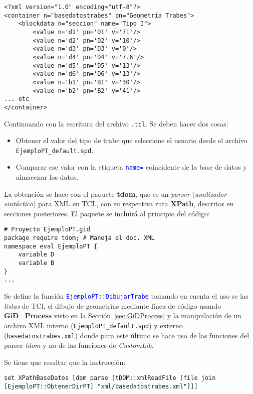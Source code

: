 \documentclass[10pt, a4paper, twocolumn]{article} %
\begin{document}
\lstset{language=XML} 
\begin{lstlisting}[caption={Extracto de la base de datos de la geometría.}]
<?xml version="1.0" encoding="utf-8"?>
<container n="basedatostrabes" pn="Geometria Trabes">
	<blockdata n="seccion" name="Tipo I">
		<value n='d1' pn='D1' v='71'/>
		<value n='d2' pn='D2' v='10'/>
		<value n='d3' pn='D3' v='0'/>
		<value n='d4' pn='D4' v='7.6'/>
		<value n='d5' pn='D5' v='13'/>
		<value n='d6' pn='D6' v='13'/>
		<value n='b1' pn='B1' v='30'/>
		<value n='b2' pn='B2' v='41'/>
... etc
</container>
\end{lstlisting}

Continuando con la escritura del archivo \texttt{.tcl}. Se deben hacer dos cosas:

\begin{itemize}
	\item Obtener el valor del tipo de trabe que seleccione el usuario desde el archivo \texttt{EjemploPT\_default.spd}.
	\item Comparar ese valor con la etiqueta \textcolor{blue}{\texttt{name=}} coincidente de la base de datos y almacenar los datos.
\end{itemize}

La obtención se hace con el paquete \textbf{tdom}, que es un \textit{parser} (\textit{analizador sintáctico}) para XML en TCL, con su respectiva ruta \textbf{XPath}, descritos en secciones posteriores. El paquete se incluirá al principio del código:

\lstset{language=tcl} 
\begin{lstlisting}[caption={Código para inicializar el proyecto y crear el menú.}]
# Proyecto EjemploPT.gid
package require tdom; # Maneja el doc. XML
namespace eval EjemploPT {
	variable D
	variable B
}
...
\end{lstlisting}

Se define la función \textcolor{blue}{\texttt{EjemploPT::DibujarTrabe}} tomando en cuenta el uso se las \textit{listas} de TCl, el dibujo de geometrías mediante línea de código usando \textbf{GiD\_Process} visto en la Sección~\ref{sec:GiDProcess} y la manipulación de un archivo XML interno (\texttt{EjemploPT\_default.spd}) y externo (\texttt{basedatostrabes.xml}) donde para este último se hace uso de las funciones del parser \textit{tdom} y no de las funciones de \textit{CustomLib}.

Se tiene que resaltar que la instrucción:

\lstset{language=tcl} 
\begin{lstlisting}[caption={Obtener el nodo raíz del archivo \texttt{basedatostrabes.xml}.}]
	set XPathBaseDatos [dom parse [tDOM::xmlReadFile [file join [EjemploPT::ObtenerDirPT] "xml/basedatostrabes.xml"]]]
\end{lstlisting}
\end{document}
